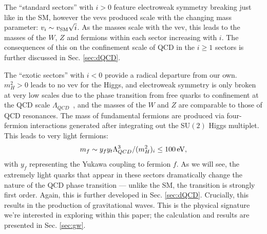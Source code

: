 \documentclass[nofootinbib,twocolumn,preprintnumbers]{revtex4-1}
\begin{document}
%
The ``standard sectors'' with $i>0$ feature electroweak symmetry breaking just like in the SM, however the vevs produced scale with the changing mass parameter: $v_i \sim v_{\rm SM}\sqrt{i}$. As the masses scale with the vev, this leads to the masses of the $W$, $Z$ and fermions within each sector increasing with $i$. The consequences of this on the confinement scale of QCD in the $i \geq 1$ sectors is further discussed in Sec. \ref{sec:dQCD}. 

The ``exotic sectors'' with $i<0$ provide a radical departure from our own. $m_H^2 > 0$ leads to no vev for the Higgs, and electroweak symmetry is only broken at very low scales due to the phase transition from free quarks to confinement at the QCD scale $\Lambda_{QCD}$~\cite{}, and the masses of the $W$ and $Z$ are comparable to those of QCD resonances. The mass of fundamental fermions are produced via four-fermion interactions generated after integrating out the SU$(2)$ Higgs multiplet. This leads to very light fermions: 
\begin{equation}\label{eqn:exoticFM}
m_f \sim y_f y_t \Lambda_{QCD}^3/(m^2_H)_i \leq 100 \,{\rm eV},
\end{equation}
with $y_f$ representing the Yukawa coupling to fermion $f$. As we will see, the extremely light quarks that appear in these sectors dramatically change the nature of the QCD phase transition --- unlike the SM, the transition is strongly first order. Again, this is further developed in Sec. \ref{sec:dQCD}. Crucially, this results in the production of gravitational waves. This is the physical signature we're interested in exploring within this paper; the calculation and results are presented in Sec. \ref{sec:gw}. 
\end{document}

